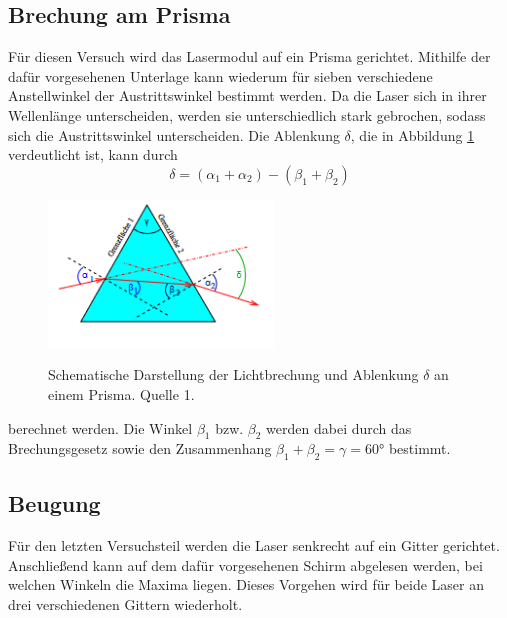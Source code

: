 \subsection{Brechung am Prisma}
Für diesen Versuch wird das Lasermodul auf ein Prisma gerichtet. Mithilfe der dafür vorgesehenen Unterlage kann wiederum für sieben verschiedene Anstellwinkel der Austrittswinkel bestimmt werden. Da die Laser sich in ihrer Wellenlänge unterscheiden, werden sie unterschiedlich stark gebrochen, sodass sich die Austrittswinkel unterscheiden.
Die Ablenkung $\delta$, die in Abbildung \ref{fig:Prisma} verdeutlicht ist, kann durch
\begin{equation}
\delta=(\alpha_1 + \alpha_2)-(\beta_1 + \beta_2)
\end{equation}
\begin{figure} [h]
    \centering
    \includegraphics[width=6cm, keepaspectratio]{Brechung am Prisma}
    \label{fig:Prisma}
    \caption{Schematische Darstellung der Lichtbrechung und Ablenkung $\delta$ an einem Prisma. Quelle 1.}
 \end{figure}
berechnet werden. Die Winkel $\beta_1$ bzw. $\beta_2$ werden dabei durch das Brechungsgesetz sowie den Zusammenhang $\beta_1+\beta_2=\gamma=60°$ bestimmt.
\subsection{Beugung}
Für den letzten Versuchsteil werden die Laser senkrecht auf ein Gitter gerichtet. Anschließend kann auf dem dafür vorgesehenen Schirm abgelesen werden, bei welchen Winkeln die Maxima liegen. Dieses Vorgehen wird für beide Laser an drei verschiedenen Gittern wiederholt. 
